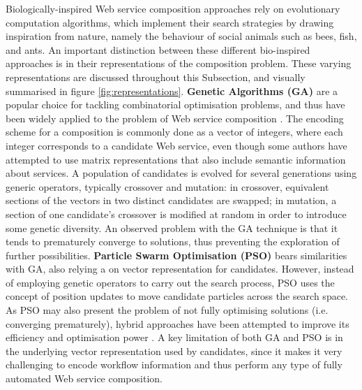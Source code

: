 Biologically-inspired Web service composition approaches rely on evolutionary computation algorithms, which implement their search strategies by drawing inspiration from nature, namely the behaviour of social animals such as bees, fish, and ants. An important distinction between these different bio-inspired approaches is in their representations of the composition problem. These varying representations are discussed throughout this Subsection, and visually summarised in figure \ref{fig:representations}. \textbf{Genetic Algorithms (GA)} are a popular choice for tackling combinatorial optimisation problems, and thus have been widely applied to the problem of Web service composition \cite{wang2012survey}. The encoding scheme for a composition is commonly done as a vector of integers, where each integer corresponds to a candidate Web service, even though some authors have attempted to use matrix representations that also include semantic information about services. A population of candidates is evolved for several generations using generic operators, typically crossover and mutation: in crossover, equivalent sections of the vectors in two distinct candidates are swapped; in mutation, a section of one candidate's crossover is modified at random in order to introduce some genetic diversity. An observed problem with the GA technique is that it tends to prematurely converge to solutions, thus preventing the exploration of further possibilities. \textbf{Particle Swarm Optimisation (PSO)} bears similarities with GA, also relying a on vector representation for candidates. However, instead of employing genetic operators to carry out the search process, PSO uses the concept of position updates to move candidate particles across the search space. As PSO may also present the problem of not fully optimising solutions (i.e. converging prematurely), hybrid approaches have been attempted to improve its efficiency and optimisation power \cite{wang2012survey}. A key limitation of both GA and PSO is in the underlying vector representation used by candidates, since it makes it very challenging to encode workflow information and thus perform any type of fully automated Web service composition.

